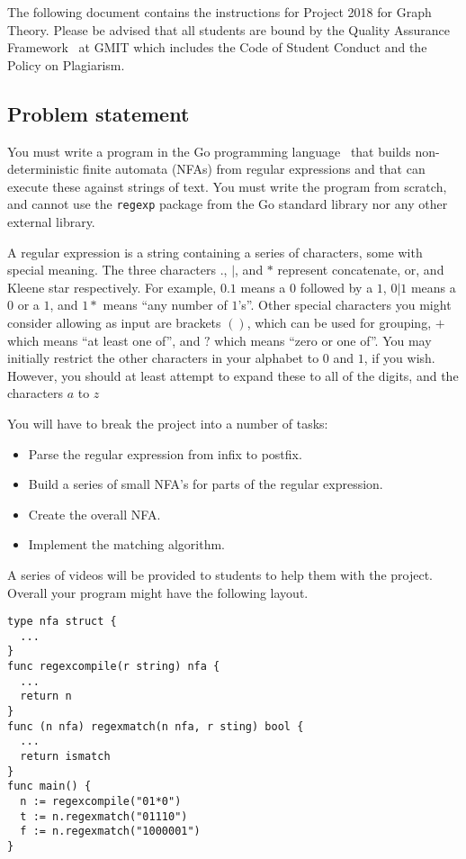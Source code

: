 \documentclass[12pt, a4paper]{article}
\title{\projectname}
\author{\modulename}
\date{Due: \duedate}
\newcommand{\modulename}{Graph Theory}
\newcommand{\projectyear}{2018}
\newcommand{\projectname}{Project \projectyear}
\begin{document}
\maketitle

\noindent
The following document contains the instructions for \projectname{} for \modulename{}.
Please be advised that all students are bound by the Quality Assurance Framework~\cite{gmitqaf} at GMIT which includes the Code of Student Conduct and the Policy on Plagiarism.

\subsection*{Problem statement}
You must write a program in the Go programming language~\cite{golang} that builds non-deterministic finite automata (NFAs) from regular expressions and that can execute these against strings of text.
You must write the program from scratch, and cannot use the \texttt{regexp} package from the Go standard library nor any other external library.

A regular expression is a string containing a series of characters, some with special meaning.
The three characters $.$, $|$, and $*$ represent concatenate, or, and Kleene star respectively.
For example, $0.1$ means a $0$ followed by a $1$, $0|1$ means a $0$ or a $1$, and $1*$ means ``any number of $1$'s''.
Other special characters you might consider allowing as input are brackets $()$, which can be used for grouping, $+$ which means ``at least one of'', and $?$ which means ``zero or one of''.
You may initially restrict the other characters in your alphabet to $0$ and $1$, if you wish.
However, you should at least attempt to expand these to all of the digits, and the characters $a$ to $z$

You will have to break the project into a number of tasks:
\begin{itemize}
  \item Parse the regular expression from infix to postfix.
  \item Build a series of small NFA's for parts of the regular expression.
  \item Create the overall NFA.
  \item Implement the matching algorithm.
\end{itemize}
A series of videos will be provided to students to help them with the project.
Overall your program might have the following layout.

\begin{verbatim}
type nfa struct {
  ...
}
func regexcompile(r string) nfa {
  ...
  return n
}
func (n nfa) regexmatch(n nfa, r sting) bool {
  ...
  return ismatch
}
func main() {
  n := regexcompile("01*0")
  t := n.regexmatch("01110")
  f := n.regexmatch("1000001")
}
\end{verbatim}
\end{document}
